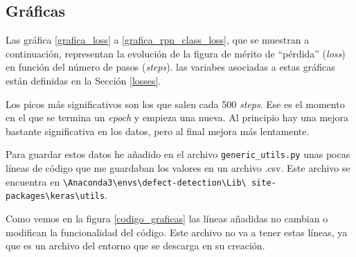 
\newpage

\subsection{Gráficas \label{SectionGraficas}}

Las gráfica \ref{grafica_loss} a \ref{grafica_rpn_class_loss}, que se muestran a continuación, representan la evolución de la figura de mérito de ``pérdida'' (\textit{loss}) en función del número de pasos (\textit{steps}). las variabes asociadas a estas gráficas están definidas en la Sección \ref{losses}.







Los picos más significativos son los que salen cada 500 \textit{steps}. Ese es el momento en el que se termina un \textit{epoch} y empieza una nueva. Al principio hay una mejora bastante significativa en los datos, pero al final mejora más lentamente.

Para guardar estos datos he añadido en el archivo \texttt{generic\_utils.py} unas pocas líneas de código que me guardaban los valores en un archivo .csv. Este archivo se encuentra en \texttt{\textbackslash{}Anaconda3\textbackslash{}envs\textbackslash{}defect-detection\textbackslash{}Lib\textbackslash{} site-packages\textbackslash{}keras\textbackslash{}utils}.


Como vemos en la figura \ref{codigo_graficas} las líneas añadidas no cambian o modifican la funcionalidad del código. Este archivo no va a tener estas líneas, ya que es un archivo del entorno que se descarga en su creación.

